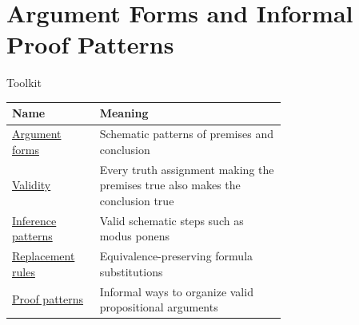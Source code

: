 \section{Argument Forms and Informal Proof Patterns}

\begin{toolkitbox}{Toolkit}
\small
\begin{tabular}{l p{0.68\linewidth}}
\toprule
\textbf{Name} & \textbf{Meaning} \\
\midrule
\hyperref[def:argument-form-propositional-logic]{Argument forms} & Schematic patterns of premises and conclusion \\
\hyperref[def:valid-argument-form-propositional-logic]{Validity} & Every truth assignment making the premises true also makes the conclusion true \\
\hyperref[thm:modus-ponens-validity-propositional-logic]{Inference patterns} & Valid schematic steps such as modus ponens \\
\hyperref[def:rule-of-replacement-propositional-logic]{Replacement rules} & Equivalence-preserving formula substitutions \\
\hyperref[def:informal-proof-pattern-propositional-logic]{Proof patterns} & Informal ways to organize valid propositional arguments \\
\bottomrule
\end{tabular}
\end{toolkitbox}












